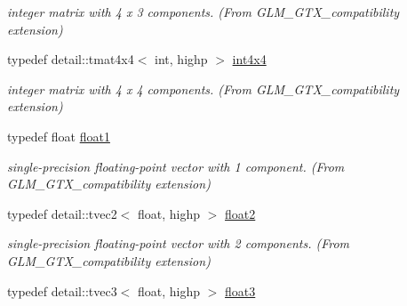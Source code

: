 \begin{CompactItemize}
\begin{CompactList}\small\item\em integer matrix with 4 x 3 components. (From GLM\_\-GTX\_\-compatibility extension) \item\end{CompactList}\item 
\hypertarget{group__gtx__compatibility_g5f8072c2dce67ad49939e12b168d1de1}{
typedef detail::tmat4x4$<$ int, highp $>$ \hyperlink{group__gtx__compatibility_g5f8072c2dce67ad49939e12b168d1de1}{int4x4}}
\label{group__gtx__compatibility_g5f8072c2dce67ad49939e12b168d1de1}

\begin{CompactList}\small\item\em integer matrix with 4 x 4 components. (From GLM\_\-GTX\_\-compatibility extension) \item\end{CompactList}\item 
\hypertarget{group__gtx__compatibility_ge0ad1b0450320cda98bbbecb56bc3167}{
typedef float \hyperlink{group__gtx__compatibility_ge0ad1b0450320cda98bbbecb56bc3167}{float1}}
\label{group__gtx__compatibility_ge0ad1b0450320cda98bbbecb56bc3167}

\begin{CompactList}\small\item\em single-precision floating-point vector with 1 component. (From GLM\_\-GTX\_\-compatibility extension) \item\end{CompactList}\item 
\hypertarget{group__gtx__compatibility_g6ab0b791bbb15ef51a0e930a8710e6b1}{
typedef detail::tvec2$<$ float, highp $>$ \hyperlink{group__gtx__compatibility_g6ab0b791bbb15ef51a0e930a8710e6b1}{float2}}
\label{group__gtx__compatibility_g6ab0b791bbb15ef51a0e930a8710e6b1}

\begin{CompactList}\small\item\em single-precision floating-point vector with 2 components. (From GLM\_\-GTX\_\-compatibility extension) \item\end{CompactList}\item 
\hypertarget{group__gtx__compatibility_g7e0d8fa3501c0a7eaaca31adb6e02de2}{
typedef detail::tvec3$<$ float, highp $>$ \hyperlink{group__gtx__compatibility_g7e0d8fa3501c0a7eaaca31adb6e02de2}{float3}}
\label{group__gtx__compatibility_g7e0d8fa3501c0a7eaaca31adb6e02de2}


\end{CompactItemize}
